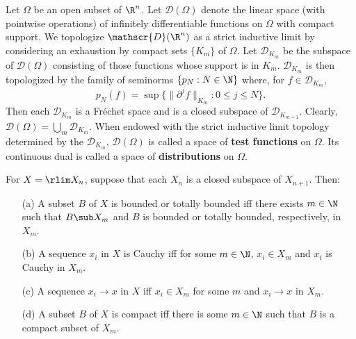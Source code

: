 \begin{example}
Let $\Omega$ be an open subset of $\R^n$. Let $\mathscr{D}(\Omega)$ denote the linear space (with pointwise operations) of infinitely differentiable functions on $\Omega$ with compact support. We topologize $\mathscr{D}(\R^n)$ as a strict inductive limit by considering an exhaustion by compact sets $\{K_m\}$ of $\Omega$. Let $\mathscr{D}_{K_m}$ be the subspace of $\mathscr{D}(\Omega)$ consisting of those functions whose support is in $K_m$. $\mathscr{D}_{K_m}$ is then topologized by the family of seminorms $\{p_N:N\in\N\}$ where, for $f\in\mathscr{D}_{K_m}$,
\[p_N(f)=\sup\{\|\partial^jf\|_{K_m}:0\leq j\leq N\}.\]
Then each $\mathscr{D}_{K_m}$ is a Fr\'echet space and is a closed subspace of $\mathscr{D}_{K_{m+1}}$. Clearly, $\mathscr{D}(\Omega)=\bigcup_m\mathscr{D}_{K_m}$. When endowed with the strict inductive limit topology determined by the $\mathscr{D}_{K_m}$, $\mathscr{D}(\Omega)$ is called a space of \textbf{test functions} on $\Omega$. Its continuous dual is called a space of \textbf{distributions} on $\Omega$.
\end{example}
\begin{proposition}\label{LCS str inductive limit bounded compact}
For $X=\rlim X_n$, suppose that each $X_n$ is a closed subspace of $X_{n+1}$. Then:
\begin{itemize}
\item[(a)] A subset $B$ of $X$ is bounded or totally bounded iff there exists $m\in\N$ such that $B\sub X_m$ and $B$ is bounded or totally bounded, respectively, in $X_m$.
\item[(b)] A sequence $x_i$ in $X$ is Cauchy iff for some $m\in\N$, $x_i\in X_m$ and $x_i$ is Cauchy in $X_m$.
\item[(c)] A sequence $x_i\to x$ in $X$ iff $x_i\in X_m$ for some $m$ and $x_i\to x$ in $X_m$.
\item[(d)] A subset $B$ of $X$ is compact iff there is some $m\in\N$ such that $B$ is a compact subset of $X_m$.
\end{itemize}
\end{proposition}
